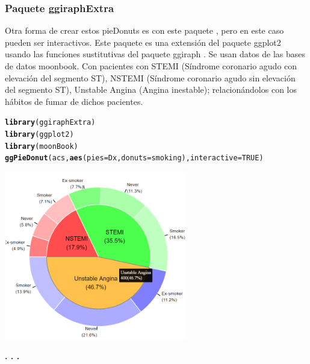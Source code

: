 \documentclass{article}\usepackage[]{graphicx}\usepackage[]{color}
\makeatletter
\newcommand{\hlnum}[1]{\textcolor[rgb]{0.686,0.059,0.569}{#1}}%
\newcommand{\hlstd}[1]{\textcolor[rgb]{0.345,0.345,0.345}{#1}}%
\newcommand{\hlkwc}[1]{\textcolor[rgb]{0.333,0.667,0.333}{#1}}%
\newcommand{\hlkwd}[1]{\textcolor[rgb]{0.737,0.353,0.396}{\textbf{#1}}}%
\newenvironment{kframe}{%
 \def\at@end@of@kframe{}%
 \ifinner\ifhmode%
  \def\at@end@of@kframe{\end{minipage}}%
  \begin{minipage}{\columnwidth}%
 \fi\fi%
 \def\FrameCommand##1{\hskip\@totalleftmargin \hskip-\fboxsep
 \colorbox{shadecolor}{##1}\hskip-\fboxsep
     \hskip-\linewidth \hskip-\@totalleftmargin \hskip\columnwidth}%
 \MakeFramed {\advance\hsize-\width
   \@totalleftmargin\z@ \linewidth\hsize
   \@setminipage}}%
 {\par\unskip\endMakeFramed%
 \at@end@of@kframe}
\newenvironment{knitrout}{}{} %
\makeatother
\begin{document}
\subsubsection{Paquete ggiraphExtra}
Otra forma de crear estos pieDonuts es con este paquete \cite{docu_ggiraphExtra}
, pero en este caso pueden ser interactivos. Este paquete es una extensi\'on del paquete ggplot2 \cite{docu_ggplot2}
usando las funciones sustitutivas del paquete ggiraph \cite{docu_ggiraph}
.
Se usan datos de las bases de datos moonbook. Con pacientes con STEMI (S\'indrome coronario agudo con elevaci\'on del segmento ST), NSTEMI (S\'indrome coronario agudo sin elevaci\'on del segmento ST), Unstable Angina (Angina inestable); relacion\'andolos con los h\'abitos de fumar de dichos pacientes.
\begin{knitrout}
\color{fgcolor}\begin{kframe}
\begin{alltt}
\hlkwd{library}\hlstd{(ggiraphExtra)}
\hlkwd{library}\hlstd{(ggplot2)}
\hlkwd{library}\hlstd{(moonBook)}
\hlkwd{ggPieDonut}\hlstd{(acs,}\hlkwd{aes}\hlstd{(}\hlkwc{pies}\hlstd{=Dx,}\hlkwc{donuts}\hlstd{=smoking),} \hlkwc{interactive} \hlstd{=} \hlnum{TRUE}\hlstd{)}
\end{alltt}
\end{kframe}
\end{knitrout}
\vbox{
    \centering
    \includegraphics[width=0.6\textwidth]{imag/pieDonut_inte}
}
\begin{center}
\textbf{. . .}
\end{center}
\end{document}
